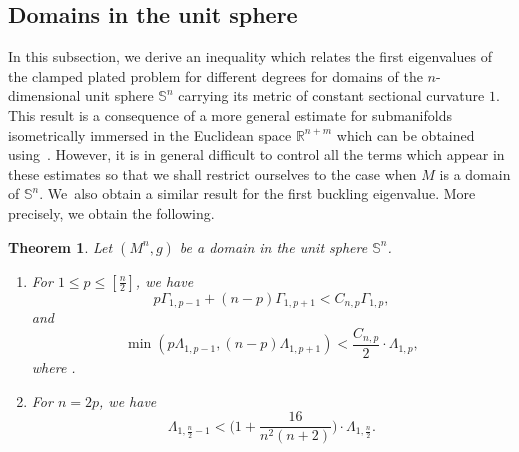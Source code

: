 \documentclass[10pt,a4paper]{amsart}
\numberwithin{equation}{section}
\newtheorem{Theorem}{Theorem}[section]
\theoremstyle{definition}
\begin{document}
\subsection{Domains in the unit sphere}%

In this subsection, we derive an inequality which relates the first eigenvalues of the clamped plated problem for different degrees for domains of the $n$-dimensional unit sphere $\mathbb{S}^n$ carrying its metric of constant sectional curvature $1$.
This result is a consequence of a more general estimate for submanifolds isometrically immersed in the Euclidean space $\mathbb{R}^{n+m}$ which can be obtained using~\cite[Lemma 3.8]{EGHM}.
However, it is in general difficult to control all the terms which appear in these estimates so that we shall restrict ourselves to the case when $M$ is a domain of $\mathbb{S}^n$.
We~also obtain a similar result for the first buckling eigenvalue.
More precisely, we obtain the following.


\begin{Theorem}\label{t:domainSn}
Let $(M^n,g)$ be a domain in the unit sphere $\mathbb{S}^n$.
\begin{enumerate}\itemsep=0pt
\item[$1.$] For $1\leq p\leq [\frac{n}{2}]$, we have
\begin{equation}\label{eq:upperboundGammainSn}
p \Gamma_{1,p-1}+ (n-p) \Gamma_{1,p+1}< C_{n,p} \Gamma_{1,p},
\end{equation}
and
\begin{equation}\label{eq:upperboundLambdainSn}
\min( p\Lambda_{1,p-1}, (n-p)\Lambda_{1,p+1})< \frac{C_{n,p}}{2}\cdot\Lambda_{1,p},
\end{equation}
where .
\item[$2.$] For $n=2p$, we have
\begin{equation}\label{eq:upperboundLambdainSnforn=2p}
\Lambda_{1,\frac{n}{2}-1} < \biggl(1+\frac{16}{n^2(n+2)}\biggr)\cdot \Lambda_{1,\frac{n}{2}}.
\end{equation}
\end{enumerate}
\end{Theorem}
\end{document}
